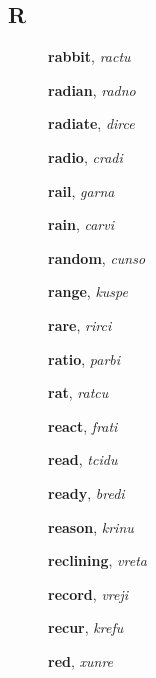 \documentclass[12pt]{book}
\begin{document}
\subsection{R} %

\begin{description}

\item[ ] \textbf{rabbit}, \textit{ractu}

\item[ ] \textbf{radian}, \textit{radno}

\item[ ] \textbf{radiate}, \textit{dirce}

\item[ ] \textbf{radio}, \textit{cradi}

\item[ ] \textbf{rail}, \textit{garna}

\item[ ] \textbf{rain}, \textit{carvi}

\item[ ] \textbf{random}, \textit{cunso}

\item[ ] \textbf{range}, \textit{kuspe}

\item[ ] \textbf{rare}, \textit{rirci}

\item[ ] \textbf{ratio}, \textit{parbi}

\item[ ] \textbf{rat}, \textit{ratcu}

\item[ ] \textbf{react}, \textit{frati}

\item[ ] \textbf{read}, \textit{tcidu}

\item[ ] \textbf{ready}, \textit{bredi}

\item[ ] \textbf{reason}, \textit{krinu}

\item[ ] \textbf{reclining}, \textit{vreta}

\item[ ] \textbf{record}, \textit{vreji}

\item[ ] \textbf{recur}, \textit{krefu}

\item[ ] \textbf{red}, \textit{xunre}


\end{description}
\end{document}
